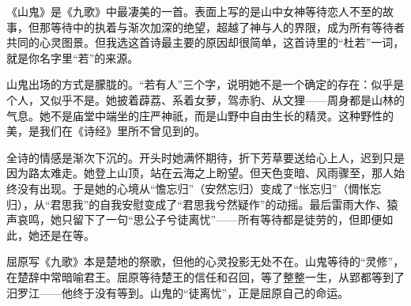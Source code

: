 \begin{appreciation}
《山鬼》是《九歌》中最凄美的一首。表面上写的是山中女神等待恋人不至的故事，但那等待中的执着与渐次加深的绝望，超越了神与人的界限，成为所有等待者共同的心灵图景。但我选这首诗最主要的原因却很简单，这首诗里的“杜若”一词，就是你名字里“若”的来源。

山鬼出场的方式是朦胧的。“若有人”三个字，说明她不是一个确定的存在：似乎是个人，又似乎不是。她披着薜荔、系着女萝，驾赤豹、从文狸——周身都是山林的气息。她不是庙堂中端坐的庄严神祇，而是山野中自由生长的精灵。这种野性的美，是我们在《诗经》里所不曾见到的。

全诗的情感是渐次下沉的。开头时她满怀期待，折下芳草要送给心上人，迟到只是因为路太难走。她登上山顶，站在云海之上盼望。但天色变暗、风雨骤至，那人始终没有出现。于是她的心境从“憺忘归”（安然忘归）变成了“怅忘归”（惆怅忘归），从“君思我”的自我安慰变成了“君思我兮然疑作”的动摇。最后雷雨大作、猿声哀鸣，她只留下了一句“思公子兮徒离忧”——所有等待都是徒劳的，但即便如此，她还是在等。

屈原写《九歌》本是楚地的祭歌，但他的心灵投影无处不在。山鬼等待的“灵修”，在楚辞中常暗喻君王。屈原等待楚王的信任和召回，等了整整一生，从郢都等到了汨罗江——他终于没有等到。山鬼的“徒离忧”，正是屈原自己的命运。
\end{appreciation}
